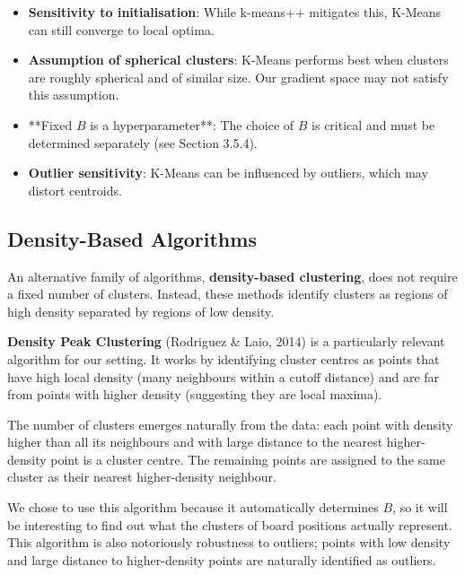 \begin{itemize}
  \item \textbf{Sensitivity to initialisation}: While k-means++ mitigates this, K-Means can still converge to local optima.
  \item \textbf{Assumption of spherical clusters}: K-Means performs best when clusters are roughly spherical and of similar size. Our gradient space may not satisfy this assumption.
  \item **Fixed $B$ is a hyperparameter**: The choice of $B$ is critical and must be determined separately (see Section 3.5.4).
  \item \textbf{Outlier sensitivity}: K-Means can be influenced by outliers, which may distort centroids.
\end{itemize}


\subsection{Density-Based Algorithms}

An alternative family of algorithms, \textbf{density-based clustering}, does not require a fixed number of clusters. Instead, these methods identify clusters as regions of high density separated by regions of low density.

\textbf{Density Peak Clustering} (Rodriguez \& Laio, 2014) is a particularly relevant algorithm for our setting. It works by identifying cluster centres as points that have high local density (many neighbours within a cutoff distance) and are far from points with higher density (suggesting they are local maxima).

The number of clusters emerges naturally from the data: each point with density higher than all its neighbours and with large distance to the nearest higher-density point is a cluster centre. The remaining points are assigned to the same cluster as their nearest higher-density neighbour.

We chose to use this algorithm because it automatically determines $B$, so it will be interesting to find out what the clusters of board positions actually represent. This algorithm is also notoriously robustness to outliers; points with low density and large distance to higher-density points are naturally identified as outliers.


